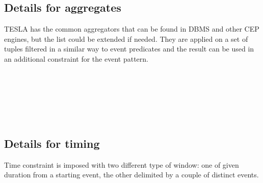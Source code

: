 \subsection{Details for aggregates}
TESLA has the common aggregators that can be found in DBMS and other CEP engines, but the list could be extended if needed. They are applied on a set of tuples filtered in a similar way to event predicates and the result can be used in an additional constraint for the event pattern.
\begin{bnf*}
\\
\\
\\
\\
\\
\end{bnf*}

\subsection{Details for timing}
Time constraint is imposed with two different type of window: one of given duration from a starting event, the other delimited by a couple of distinct events.
\begin{bnf*}
\\
\\
\\
\\
\end{bnf*}

